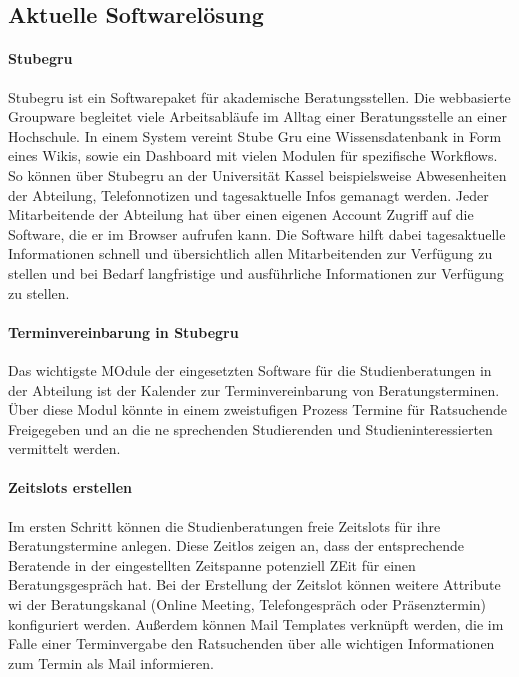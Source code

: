 \documentclass[12pt]{article}
\begin{document}
\subsection{Aktuelle Softwarelösung}
\paragraph{Stubegru}
Stubegru ist ein Softwarepaket für akademische Beratungsstellen. Die
webbasierte Groupware begleitet viele Arbeitsabläufe im Alltag einer
Beratungsstelle an einer Hochschule. In einem System vereint Stube Gru eine
Wissensdatenbank in Form eines Wikis, sowie ein Dashboard mit vielen Modulen
für spezifische Workflows. So können über Stubegru an der Universität Kassel
beispielsweise Abwesenheiten der Abteilung, Telefonnotizen und tagesaktuelle
Infos gemanagt werden. Jeder Mitarbeitende der Abteilung hat über einen
eigenen Account Zugriff auf die Software, die er im Browser aufrufen kann. Die
Software hilft dabei tagesaktuelle Informationen schnell und übersichtlich
allen Mitarbeitenden zur Verfügung zu stellen und bei Bedarf langfristige und
ausführliche Informationen zur Verfügung zu stellen.\cite{stubegruWebsite}

\paragraph{Terminvereinbarung in Stubegru}
Das wichtigste MOdule der eingesetzten Software für die Studienberatungen in der
Abteilung ist der Kalender zur Terminvereinbarung von Beratungsterminen. Über
diese Modul könnte in einem zweistufigen Prozess Termine für Ratsuchende
Freigegeben und an die ne sprechenden Studierenden und Studieninteressierten
vermittelt werden.

\paragraph{Zeitslots erstellen}
Im ersten Schritt können die Studienberatungen freie Zeitslots für ihre
Beratungstermine anlegen. Diese Zeitlos zeigen an, dass der entsprechende
Beratende in der eingestellten Zeitspanne potenziell ZEit für einen
Beratungsgespräch hat. Bei der Erstellung der Zeitslot können weitere Attribute
wi der Beratungskanal (Online Meeting, Telefongespräch oder Präsenztermin)
konfiguriert werden. Außerdem können Mail Templates verknüpft werden, die im
Falle einer Terminvergabe den Ratsuchenden über alle wichtigen Informationen zum Termin als Mail
informieren.
\end{document}
